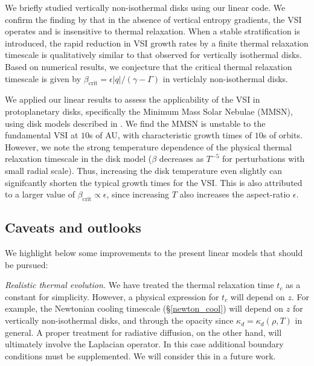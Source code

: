 We briefly studied vertically non-isothermal disks using our linear 
code. We confirm the finding by \cite{nelson13} that in the absence
of vertical entropy gradients, the VSI operates and is insensitive to
thermal relaxation. When a stable stratification is introduced, the
rapid reduction in VSI growth rates by a finite thermal relaxation
timescale is qualitatively similar to that observed for vertically
isothermal disks. Based on numerical results, we conjecture that the
critical thermal relaxation timescale is given by
$\beta_\mathrm{crit}=\epsilon|q|/(\gamma-\Gamma)$ in verticlaly
non-isothermal disks.  


We applied our linear results to assess the applicability of the VSI in
protoplanetary disks, specifically the Minimum Mass Solar Nebulae (MMSN),
using disk models described in \cite{chiang10}. We find the MMSN is
unstable to the fundamental VSI at $10$s of AU, with characteristic
growth times of $10$s of orbits. However, we note the strong
temperature dependence of the physical thermal relaxation timescale
in the disk model ($\beta$ decreases as $T^{-5}$ for perturbations with small
radial scale). Thus, increasing the disk temperature even slightly can signifcantly 
shorten the typical growth times for the VSI. This is also attributed
to a larger value of $\beta_\mathrm{crit}\propto\epsilon$, since increasing $T$ also
increases the aspect-ratio $\epsilon$. 




\subsection{Caveats and outlooks} 
We highlight below some improvements to the present  
linear models that should be pursued:

\emph{Realistic thermal evolution.} We have treated the thermal
relaxation time $t_c$ as a constant for simplicity. However, a
physical expression for $t_c$ will depend on 
$z$. For example, the Newtonian cooling timescale
(\S\ref{newton_cool}) will depend on $z$ for vertically non-isothermal
disks, and through the opacity since 
$\kappa_d=\kappa_d(\rho,T)$ in general. 
A proper treatment for radiative diffusion, on the other hand, will
ultimately involve the Laplacian operator. In this case additional
boundary conditions must be supplemented. We will consider this in a
future work.  


